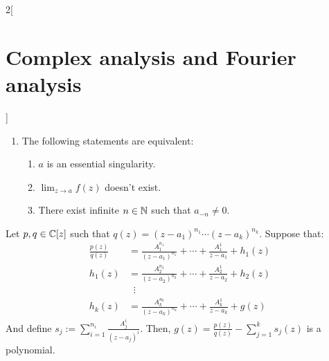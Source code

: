 \documentclass[../../../main.tex]{subfiles}
\begin{document}
\begin{multicols}{2}[\section{Complex analysis and Fourier analysis}]
\begin{corollary}
\begin{enumerate}
            \begin{enumerate}
              \item $a$ is a pole of order $m\in\NN$.
              \item $\displaystyle\lim_{z\to a} f(z){(z-a)}^k= \infty$ $\forall k\in\{0,1,\ldots,m-1\}$.
              \item $a_n=0\ \forall n\leq -m-1$ and $a_{-m}\ne 0$.
            \end{enumerate}
      \item  The following statements are equivalent:
            \begin{enumerate}
              \item $a$ is an essential singularity.
              \item $\displaystyle\lim_{z\to a} f(z)$ doesn't exist.
              \item There exist infinite $n\in\mathbb{N}$ such that $a_{-n}\ne 0$.
            \end{enumerate}
    \end{enumerate}
  \end{corollary}
  \begin{corollary}
    Let $p,q\in\mathbb{C}[z]$ such that $q(z)={(z-a_1)}^{n_1}\cdots{(z-a_k)}^{n_k}$. Suppose that:
    \begin{align*}
      \frac{p(z)}{q(z)} & =\frac{A_1^{n_1}}{{(z-a_1)}^{n_1}}+\cdots+\frac{A_1^{1}}{z-a_1}+h_1(z) \\
      h_1(z)            & =\frac{A_2^{n_2}}{{(z-a_2)}^{n_2}}+\cdots+\frac{A_2^{1}}{z-a_2}+h_2(z) \\
                        & \;\;\vdots                                                             \\
      h_k(z)            & =\frac{A_k^{n_k}}{{(z-a_k)}^{n_k}}+\cdots+\frac{A_k^{1}}{z-a_k}+g(z)
    \end{align*}
    And define $s_j:=\sum_{i= 1}^{n_i}\frac{A_j^i}{{(z-a_j)}^i}$.
    Then, $g(z)=\frac{p(z)}{q(z)}-\sum_{j=1}^k s_j(z)$ is a polynomial.
  \end{corollary}

\end{multicols}
\end{document}
